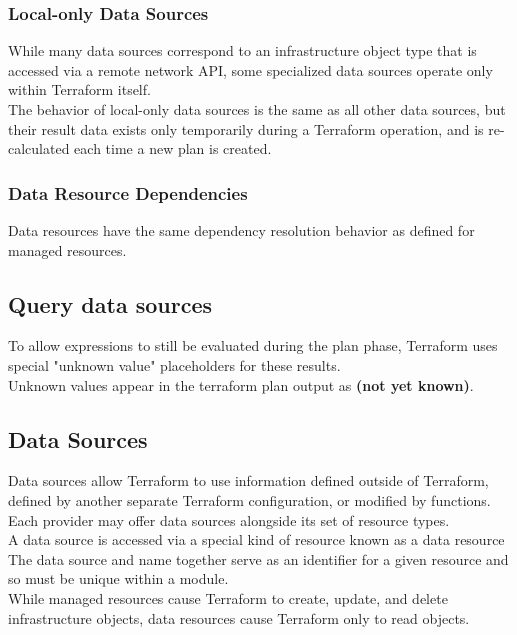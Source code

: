 \documentclass[12pt, letterpaper, twoside]{article}
\begin{document}
\subsubsection{Local-only Data Sources}
While many data sources correspond to an infrastructure object type that is accessed via a remote
network API, some specialized data sources operate only within Terraform itself.\\
The behavior of local-only data sources is the same as all other data sources, but their result 
data exists only temporarily during a Terraform operation, and is re-calculated each time a 
new plan is created.

\subsubsection{Data Resource Dependencies}
Data resources have the same dependency resolution behavior as defined for managed resources.

\subsection{Query data sources}



To allow expressions to still be evaluated during the plan phase, Terraform uses special "unknown value" 
placeholders for these results.\\

Unknown values appear in the terraform plan output as \textbf{(not yet known)}.

\subsection{Data Sources}
Data sources allow Terraform to use information defined outside of Terraform, defined by another separate 
Terraform configuration, or modified by functions.\\

Each provider may offer data sources alongside its set of resource types.\\

A data source is accessed via a special kind of resource known as a data resource\\
The data source and name together serve as an identifier for a given resource and so must be unique 
within a module.\\

While managed resources cause Terraform to create, update, and delete infrastructure objects, 
data resources cause Terraform only to read objects.
\end{document}
